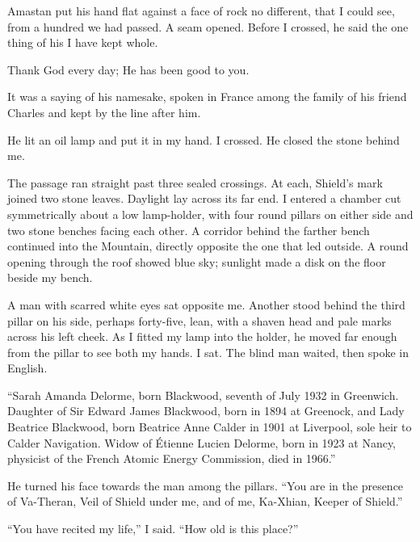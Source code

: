 Amastan put his hand flat against a face of rock no different, that I could see, from a hundred we had passed. A seam opened. Before I crossed, he said the one thing of his I have kept whole.\par

\begin{scripture}
Thank God every day; He has been good to you.
\end{scripture}

It was a saying of his namesake, spoken in France among the family of his friend Charles and kept by the line after him.\par

He lit an oil lamp and put it in my hand. I crossed. He closed the stone behind me.\par

The passage ran straight past three sealed crossings. At each, Shield's mark joined two stone leaves. Daylight lay across its far end. I entered a chamber cut symmetrically about a low lamp-holder, with four round pillars on either side and two stone benches facing each other. A corridor behind the farther bench continued into the Mountain, directly opposite the one that led outside. A round opening through the roof showed blue sky; sunlight made a disk on the floor beside my bench.\par

A man with scarred white eyes sat opposite me. Another stood behind the third pillar on his side, perhaps forty-five, lean, with a shaven head and pale marks across his left cheek. As I fitted my lamp into the holder, he moved far enough from the pillar to see both my hands. I sat. The blind man waited, then spoke in English.\par

``Sarah Amanda Delorme, born Blackwood, seventh of July 1932 in Greenwich. Daughter of Sir Edward James Blackwood, born in 1894 at Greenock, and Lady Beatrice Blackwood, born Beatrice Anne Calder in 1901 at Liverpool, sole heir to Calder Navigation. Widow of Étienne Lucien Delorme, born in 1923 at Nancy, physicist of the French Atomic Energy Commission, died in 1966.''\par

He turned his face towards the man among the pillars. ``You are in the presence of Va-Theran, Veil of Shield under me, and of me, Ka-Xhian, Keeper of Shield.''\par

``You have recited my life,'' I said. ``How old is this place?''\par

